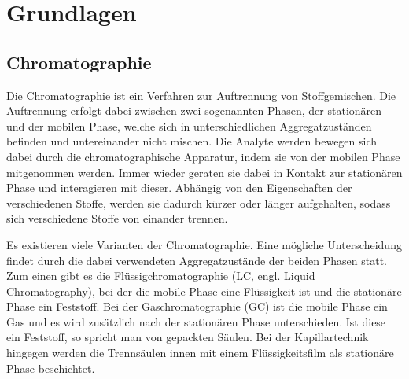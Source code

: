 
\chapter{Grundlagen}
\label{chapter:gru}

\section{Chromatographie}

Die Chromatographie ist ein Verfahren zur Auftrennung von Stoffgemischen. 
Die Auftrennung erfolgt dabei zwischen zwei sogenannten Phasen, der stationären und der mobilen Phase, welche sich in unterschiedlichen Aggregatzuständen befinden und untereinander nicht mischen. Die Analyte werden bewegen sich dabei durch die chromatographische Apparatur, indem sie von der mobilen Phase mitgenommen werden. Immer wieder geraten sie dabei in Kontakt zur stationären Phase und interagieren mit dieser. Abhängig von den Eigenschaften der verschiedenen Stoffe, werden sie dadurch kürzer oder länger aufgehalten, sodass sich verschiedene Stoffe von einander trennen.

Es existieren viele Varianten der Chromatographie. Eine mögliche Unterscheidung findet durch die dabei verwendeten Aggregatzustände der beiden Phasen statt. Zum einen gibt es die Flüssigchromatographie (LC, engl. Liquid Chromatography),
bei der die mobile Phase eine Flüssigkeit ist und die stationäre Phase ein Feststoff. 
Bei der Gaschromatographie (GC) ist die mobile Phase ein Gas und es wird zusätzlich nach der stationären Phase unterschieden. Ist diese ein Feststoff, so spricht man von gepackten Säulen. Bei der Kapillartechnik hingegen werden die Trennsäulen innen mit einem Flüssigkeitsfilm als stationäre Phase beschichtet.



